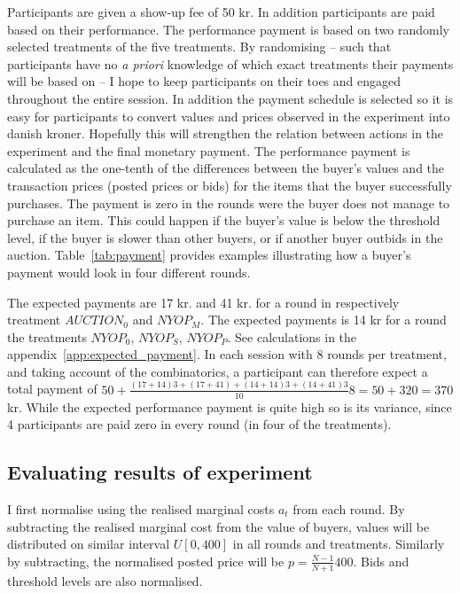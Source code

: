 \documentclass[a4paper,12pt]{article}
\begin{document}
	Participants are given a show-up fee of 50 kr. In addition participants are paid based on their performance. The performance payment is based on two randomly selected treatments of the five treatments. By randomising -- such that participants have no \emph{a priori} knowledge of which exact treatments their payments will be based on -- I hope to keep participants on their toes and engaged throughout the entire session. In addition the payment schedule is selected so it is easy for participants to convert values and prices observed in the experiment into danish kroner. Hopefully this will strengthen the relation between actions in the experiment and the final monetary payment. The performance payment is calculated as the one-tenth of the differences between the buyer's values and the transaction prices (posted prices or bids) for the items that the buyer successfully purchases. The payment is zero in the rounds were the buyer does not manage to purchase an item. This could happen if the buyer's value is below the threshold level, if the buyer is slower than other buyers, or if another buyer outbids in the auction. Table~\ref{tab:payment} provides examples illustrating how a buyer's payment would look in four different rounds.
	
	The expected payments are 17 kr. and 41 kr. for a round in respectively treatment $AUCTION_0$ and $NYOP_M$. The expected payments is 14 kr for a round the treatments $NYOP_0$, $NYOP_S$, $NYOP_P$. See calculations in the appendix~\ref{app:expected_payment}. In each session with 8 rounds per treatment, and taking account of the combinatorics, a participant can therefore expect a total payment of $50 + \frac{(17+14)3 + (17+41) + (14+14)3 + (14+41)3}{10}8 = 50 + 320 = 370$ kr. While the expected performance payment is quite high so is its variance, since 4 participants are paid zero in every round (in four of the treatments).
	
	\subsection{Evaluating results of experiment}
	
	I first normalise using the realised marginal costs $a_t$ from each round. By subtracting the realised marginal cost from the value of buyers, values will be distributed on similar interval $U[0,400]$ in all rounds and treatments. Similarly by subtracting, the normalised posted price will be $p = \frac{N-1}{N+1}400$. Bids and threshold levels are also normalised. 
\end{document}
